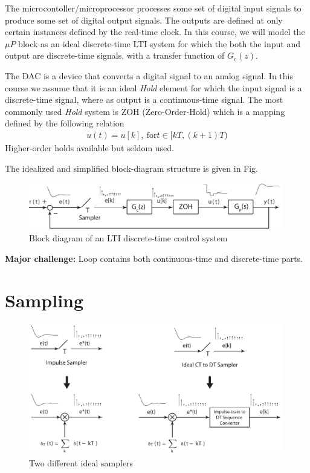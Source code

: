 \documentclass[twoside]{article}
\begin{document}
The microcontoller/microprocessor processes some set of digital input signals
to produce some set of digital output signals. The outputs are defined
at only certain instances defined by the real-time clock. In this
course, we will model the $\mu P$ block as an ideal discrete-time LTI
system for which the both the input and output are discrete-time
signals, with a transfer function of $G_c(z)$.

The DAC is a device that converts a digital signal to an analog
signal. In this course we assume that it is an ideal \textit{Hold}
element for which the input signal is a discrete-time signal, where as
output is a continuous-time signal. The most commonly used
\textit{Hold} system is ZOH (Zero-Order-Hold) which is a mapping 
defined by the following relation
%
\begin{align*}
  u(t) = u[k] , \ \mathrm{for} t \in [kT , (k+1)T )
\end{align*}
%
Higher-order holds available but seldom used.

The idealized and simplified block-diagram structure is given in Fig.

\begin{figure}[h]
    \centering
      \includegraphics[width=0.99\textwidth]{idealblock}
    \caption{Block diagram of an LTI discrete-time control system}
    \label{fig:introblock}
\end{figure}

\textbf{Major challenge:} Loop contains both continuous-time and discrete-time parts.

\section*{Sampling}

\begin{figure}[h]
    \centering
      \includegraphics[width=0.99\textwidth]{sampling}
    \caption{Two different ideal samplers}
    \label{fig:sampling}
\end{figure}
\end{document}
